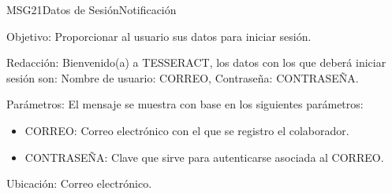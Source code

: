 \begin{mensaje}{MSG21}{Datos de Sesión}{Notificación}
	\item [Objetivo:] Proporcionar al usuario sus datos para iniciar sesión.
	\item[Redacción:] Bienvenido(a) a TESSERACT, los datos con los que deberá iniciar sesión son: Nombre de usuario: CORREO, Contraseña: CONTRASEÑA.
	\item[Parámetros:] El mensaje se muestra con base en los siguientes parámetros:
	\begin{itemize}
		\item CORREO: Correo electrónico con el que se registro el colaborador.
		\item CONTRASEÑA: Clave que sirve para autenticarse asociada al CORREO.
	\end{itemize}
	\item [Ubicación:] Correo electrónico.
\end{mensaje}